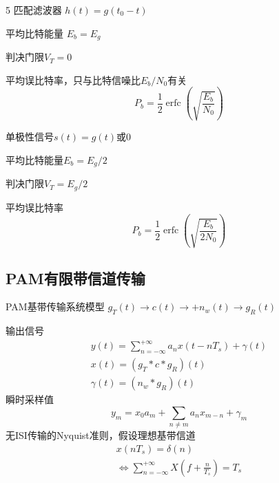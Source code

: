 \documentclass[8pt, a4paper]{extarticle}
\DeclareMathOperator{\erfc}{erfc}
\begin{document}
\begin{multicols}{5}
匹配滤波器
\(
h(t)=g(t_0-t)
\)

平均比特能量
\(
E_b=E_g
\)

判决门限\(V_T=0\)

平均误比特率，只与比特信噪比\(E_b/N_0\)有关
\[
P_b=\frac{1}{2}\erfc\left(\sqrt{\frac{E_b}{N_0}}\right)
\]

单极性信号\(s(t)=g(t)\text{或}0\)

平均比特能量\(E_b=E_g/2\)

判决门限\(V_T=E_g/2\)

平均误比特率
\[
P_b=\frac{1}{2}\erfc\left(\sqrt{\frac{E_b}{2N_0}}\right)
\]
\subsection{PAM有限带信道传输}
PAM基带传输系统模型 \(g_T(t)\to c(t) \to +n_w(t) \to g_R(t)\)

输出信号
\[
\begin{gathered}
y(t)=\sum_{n=-\infty}^{+\infty}a_n x(t-nT_s) + \gamma(t)\\
x(t)=(g_T\ast c\ast g_R)(t)\\
\gamma(t)=(n_w\ast g_R)(t)
\end{gathered}
\]
瞬时采样值
\[
y_m = x_0a_m + \sum_{n\neq m}a_n x_{m-n} + \gamma_m
\]
无ISI传输的Nyquist准则，假设理想基带信道
\[
\begin{gathered}
x(nT_s)=\delta(n)\\
\Leftrightarrow \sum_{n=-\infty}^{+\infty}X(f+\frac{n}{T_s})=T_s
\end{gathered}
\]

\end{multicols}
\end{document}
